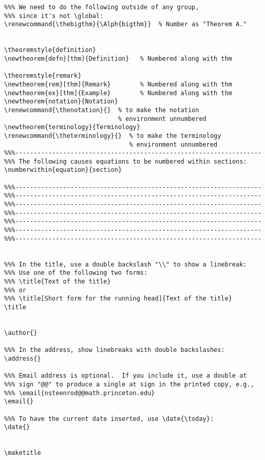 \begin{verbatim}
%%% We need to do the following outside of any group,
%%% since it's not \global:
\renewcommand{\thebigthm}{\Alph{bigthm}}  % Number as "Theorem A."


\theoremstyle{definition}
\newtheorem{defn}[thm]{Definition}   % Numbered along with thm

\theoremstyle{remark}
\newtheorem{rem}[thm]{Remark}        % Numbered along with thm
\newtheorem{ex}[thm]{Example}        % Numbered along with thm
\newtheorem{notation}{Notation}
\renewcommand{\thenotation}{}  % to make the notation
                               % environment unnumbered
\newtheorem{terminology}{Terminology}
\renewcommand{\theterminology}{}  % to make the terminology
                                  % environment unnumbered
%%%-------------------------------------------------------------------
%%% The following causes equations to be numbered within sections:
\numberwithin{equation}{section}

%%%-------------------------------------------------------------------
%%%-------------------------------------------------------------------
%%%-------------------------------------------------------------------
%%%-------------------------------------------------------------------
%%%-------------------------------------------------------------------
%%%-------------------------------------------------------------------
%%%-------------------------------------------------------------------


%%% In the title, use a double backslash "\\" to show a linebreak:
%%% Use one of the following two forms:
%%% \title{Text of the title}
%%% or
%%% \title[Short form for the running head]{Text of the title}
\title


\author{}

%%% In the address, show linebreaks with double backslashes:
\address{}

%%% Email address is optional.  If you include it, use a double at
%%% sign "@@" to produce a single at sign in the printed copy, e.g.,
%%% \email{nsteenrod@@math.princeton.edu}
\email{}

%%% To have the current date inserted, use \date{\today}:
\date{}


\maketitle


\end{verbatim}
